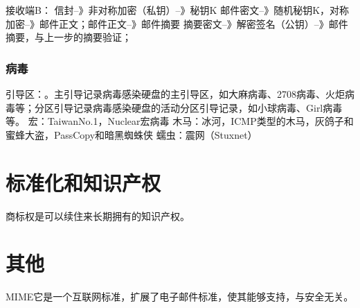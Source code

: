 \documentclass[UTF8]{article}
\begin{document}
接收端B：
信封--》非对称加密（私钥）--》秘钥K
邮件密文--》随机秘钥K，对称加密--》邮件正文；邮件正文--》邮件摘要
摘要密文--》解密签名（公钥）--》邮件摘要，与上一步的摘要验证；

\subsubsection{病毒}
引导区：。主引导记录病毒感染硬盘的主引导区，如大麻病毒、2708病毒、火炬病毒等；分区引导记录病毒感染硬盘的活动分区引导记录，如小球病毒、Girl病毒等。
宏：TaiwanNo.1，Nuclear宏病毒
木马：冰河，ICMP类型的木马，灰鸽子和蜜蜂大盗，PassCopy和暗黑蜘蛛侠
蠕虫：震网（Stuxnet）


\section{标准化和知识产权}

商标权是可以续住来长期拥有的知识产权。



\section{其他}

MIME它是一个互联网标准，扩展了电子邮件标准，使其能够支持，与安全无关。
\end{document}
